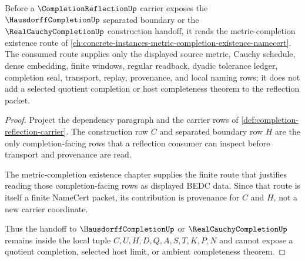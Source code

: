 \begin{theorem}\label{thm:completionreflection-metric-existence-route}
Before a $\CompletionReflectionUp$ carrier exposes the $\HausdorffCompletionUp$ separated boundary or the $\RealCauchyCompletionUp$ construction handoff, it reads the metric-completion existence route of \autoref{ch:concrete-instances-metric-completion-existence-namecert}. The consumed route supplies only the displayed source metric, Cauchy schedule, dense embedding, finite windows, regular readback, dyadic tolerance ledger, completion seal, transport, replay, provenance, and local naming rows; it does not add a selected quotient completion or host completeness theorem to the reflection packet.
\end{theorem}
\begin{proof}
Project the dependency paragraph and the carrier rows of \autoref{def:completion-reflection-carrier}. The construction row $C$ and separated boundary row $H$ are the only completion-facing rows that a reflection consumer can inspect before transport and provenance are read.

The metric-completion existence chapter supplies the finite route that justifies reading those completion-facing rows as displayed BEDC data. Since that route is itself a finite NameCert packet, its contribution is provenance for $C$ and $H$, not a new carrier coordinate.

Thus the handoff to $\HausdorffCompletionUp$ or $\RealCauchyCompletionUp$ remains inside the local tuple $C,U,H,D,Q,A,S,T,K,P,N$ and cannot expose a quotient completion, selected host limit, or ambient completeness theorem.
\end{proof}

